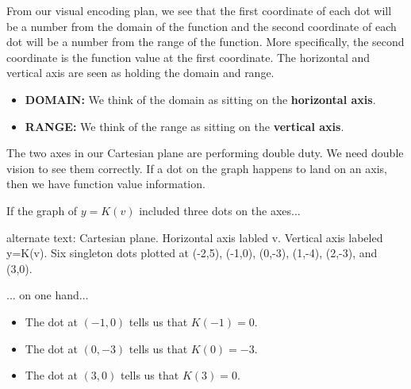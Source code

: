 \documentclass{ximera}
\begin{document}
From our visual encoding plan, we see that the first coordinate of each dot will be a number from the domain of the function and the second coordinate of each dot will be a number from the range of the function.  More specifically, the second coordinate is the function value at the first coordinate.  The horizontal and vertical axis are seen as holding the domain and range.

\begin{itemize}
\item \textbf{\textcolor{blue!55!black}{DOMAIN:}} We think of the domain as sitting on the \textbf{\textcolor{blue!55!black}{horizontal axis}}.
\item \textbf{\textcolor{purple!30!blue}{RANGE:}} We think of the range as sitting on the \textbf{\textcolor{purple!30!blue}{vertical axis}}.
\end{itemize}


The two axes in our Cartesian plane are performing double duty.  We need double vision to see them correctly. If a dot on the graph happens to land on an axis, then we have function value information.

If the graph of $y=K(v)$ included three dots on the axes...

\begin{image}
\end{image}



\textcolor{gray!90}{alternate text: Cartesian plane. Horizontal axis labled v. Vertical axis labeled y=K(v). Six singleton dots plotted at (-2,5), (-1,0), (0,-3), (1,-4), (2,-3), and (3,0).}


... on one hand...

\begin{itemize}
\item The dot at $(-1,0)$ tells us that $K(-1) = 0$.
\item The dot at $(0,-3)$ tells us that $K(0) = -3$.
\item The dot at $(3,0)$ tells us that $K(3) = 0$.
\end{itemize}
\end{document}
